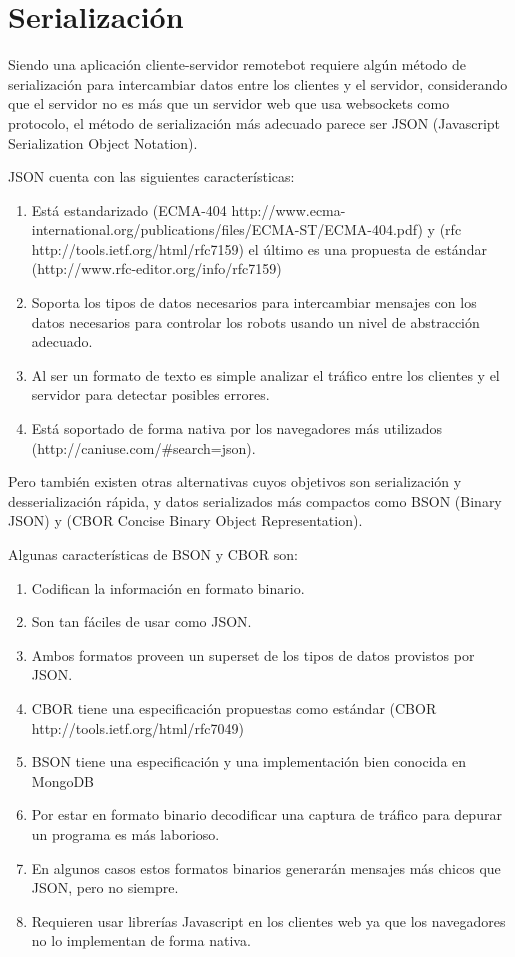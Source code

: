
\chapter{Serialización}
\label{ch:serializacion}

Siendo una aplicación cliente-servidor remotebot requiere algún método de
serialización para intercambiar datos entre los clientes y el servidor,
considerando que el servidor no es más que un servidor web que usa websockets
como protocolo, el método de serialización más adecuado parece ser JSON
(Javascript Serialization Object Notation).

JSON cuenta con las siguientes características:

\begin{enumerate}
    \item Está estandarizado (ECMA-404 http://www.ecma-international.org/publications/files/ECMA-ST/ECMA-404.pdf)
        y (rfc http://tools.ietf.org/html/rfc7159) el último es una propuesta de estándar (http://www.rfc-editor.org/info/rfc7159)
    \item Soporta los tipos de datos necesarios para intercambiar mensajes con
        los datos necesarios para controlar los robots usando un nivel de
        abstracción adecuado.
    \item Al ser un formato de texto es simple analizar el tráfico entre los
        clientes y el servidor para detectar posibles errores.
    \item Está soportado de forma nativa por los navegadores más utilizados
        (http://caniuse.com/#search=json).
\end{enumerate}

Pero también existen otras alternativas cuyos objetivos son serialización
y desserialización rápida, y datos serializados más compactos
como BSON (Binary JSON) y (CBOR Concise Binary Object Representation).

Algunas características de BSON y CBOR son:

\begin{enumerate}
    \item Codifican la información en formato binario.
    \item Son tan fáciles de usar como JSON.
    \item Ambos formatos proveen un superset de los tipos de datos provistos
        por JSON.
    \item CBOR tiene una especificación propuestas como estándar (CBOR http://tools.ietf.org/html/rfc7049)
    \item BSON tiene una especificación y una implementación bien conocida en MongoDB
    \item Por estar en formato binario decodificar una captura de tráfico
        para depurar un programa es más laborioso.
    \item En algunos casos estos formatos binarios generarán mensajes más
        chicos que JSON, pero no siempre.
    \item Requieren usar librerías Javascript en los clientes web ya que los
        navegadores no lo implementan de forma nativa.
\end{enumerate}

